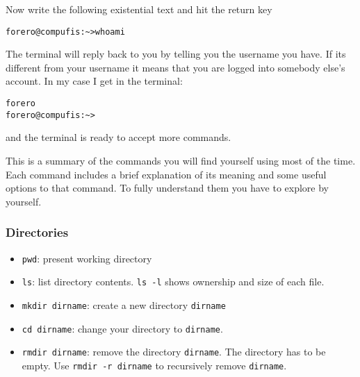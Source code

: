 \documentclass{article}
\begin{document}
Now write the following existential text and hit the return key

\begin{verbatim}
forero@compufis:~>whoami
\end{verbatim}

The terminal will reply back to you by telling you the username you have. If its different from your username it means that you are logged into somebody else's account. In my case I get in the terminal:

\begin{verbatim}
forero
forero@compufis:~>
\end{verbatim}
and the terminal is ready to accept more commands.


This is a summary of the commands you will find yourself using most of the time. Each command includes a brief explanation of its meaning and some useful options to that command. To fully understand them you have to explore by yourself.

\subsubsection*{Directories}
\begin{itemize}
\item\verb"pwd": present working directory
\item\verb"ls": list directory contents. \verb"ls -l" shows ownership and size of each file.
\item\verb"mkdir dirname": create a new directory \verb"dirname"
\item\verb"cd dirname": change your directory to \verb"dirname". 
\item\verb"rmdir dirname": remove the directory \verb"dirname". The directory has to be empty. Use \verb"rmdir -r dirname" to recursively remove \verb"dirname".
\end{itemize}
\end{document}
